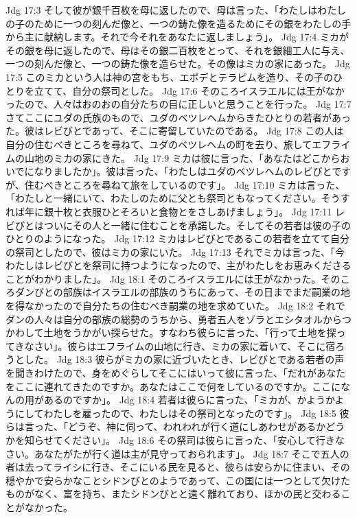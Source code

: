 Jdg 17:3  そして彼が銀千百枚を母に返したので、母は言った、「わたしはわたしの子のために一つの刻んだ像と、一つの鋳た像を造るためにその銀をわたしの手から主に献納します。それで今それをあなたに返しましょう」。
Jdg 17:4  ミカがその銀を母に返したので、母はその銀二百枚をとって、それを銀細工人に与え、一つの刻んだ像と、一つの鋳た像を造らせた。その像はミカの家にあった。
Jdg 17:5  このミカという人は神の宮をもち、エポデとテラピムを造り、その子のひとりを立てて、自分の祭司とした。
Jdg 17:6  そのころイスラエルには王がなかったので、人々はおのおの自分たちの目に正しいと思うことを行った。
Jdg 17:7  さてここにユダの氏族のもので、ユダのベツレヘムからきたひとりの若者があった。彼はレビびとであって、そこに寄留していたのである。
Jdg 17:8  この人は自分の住むべきところを尋ねて、ユダのベツレヘムの町を去り、旅してエフライムの山地のミカの家にきた。
Jdg 17:9  ミカは彼に言った、「あなたはどこからおいでになりましたか」。彼は言った、「わたしはユダのベツレヘムのレビびとですが、住むべきところを尋ねて旅をしているのです」。
Jdg 17:10  ミカは言った、「わたしと一緒にいて、わたしのために父とも祭司ともなってください。そうすれば年に銀十枚と衣服ひとそろいと食物とをさしあげましょう」。
Jdg 17:11  レビびとはついにその人と一緒に住むことを承諾した。そしてその若者は彼の子のひとりのようになった。
Jdg 17:12  ミカはレビびとであるこの若者を立てて自分の祭司としたので、彼はミカの家にいた。
Jdg 17:13  それでミカは言った、「今わたしはレビびとを祭司に持つようになったので、主がわたしをお恵みくださることがわかりました」。
Jdg 18:1  そのころイスラエルには王がなかった。そのころダンびとの部族はイスラエルの部族のうちにあって、その日までまだ嗣業の地を得なかったので自分たちの住むべき嗣業の地を求めていた。
Jdg 18:2  それでダンの人々は自分の部族の総勢のうちから、勇者五人をゾラとエシタオルからつかわして土地をうかがい探らせた。すなわち彼らに言った、「行って土地を探ってきなさい」。彼らはエフライムの山地に行き、ミカの家に着いて、そこに宿ろうとした。
Jdg 18:3  彼らがミカの家に近づいたとき、レビびとである若者の声を聞きわけたので、身をめぐらしてそこにはいって彼に言った、「だれがあなたをここに連れてきたのですか。あなたはここで何をしているのですか。ここになんの用があるのですか」。
Jdg 18:4  若者は彼らに言った、「ミカが、かようかようにしてわたしを雇ったので、わたしはその祭司となったのです」。
Jdg 18:5  彼らは言った、「どうぞ、神に伺って、われわれが行く道にしあわせがあるかどうかを知らせてください」。
Jdg 18:6  その祭司は彼らに言った、「安心して行きなさい。あなたがたが行く道は主が見守っておられます」。
Jdg 18:7  そこで五人の者は去ってライシに行き、そこにいる民を見ると、彼らは安らかに住まい、その穏やかで安らかなことシドンびとのようであって、この国には一つとして欠けたものがなく、富を持ち、またシドンびとと遠く離れており、ほかの民と交わることがなかった。
